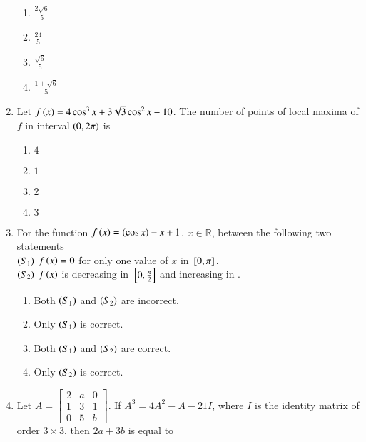 \documentclass[journal,12pt,onecolumn]{IEEEtran}
\theoremstyle{remark}
\begin{document}
\begin{enumerate}[start=1]
\begin{enumerate}
			\item $\frac{2\sqrt{6}}{5}$\\
			\item $\frac{24}{5}$\\
			\item $\frac{\sqrt{6}}{5}$\\
			\item $\frac{1+\sqrt{6}}{5}$\\
		\end{enumerate}
	\item Let $f\left(x\right)=4\cos^3{x}+3\sqrt{3}\cos^2{x}-10$. The number of points of local maxima of $f$ in interval $\left(0,2\pi\right)$ is
		\begin{enumerate}
			\item $4$\\
			\item $1$\\
			\item $2$\\
			\item $3$\\
		\end{enumerate}
	\item For the function $f\left(x\right)=\left(\cos{x}\right)-x+1$, $x\in\mathbb{R}$, between the following two statements\\
		$\left(S_1\right)$ $f\left(x\right)=0$ for only one value of $x$ in ${}\left[0,\pi\right].$\\
		$\left(S_2\right)$ $f\left(x\right)$ is decreasing in ${}\left[0,\frac{\pi}{2}\right]$ and increasing in .\\
		\begin{enumerate}
			\item Both $\left(S_1\right)$ and $\left(S_2\right)$ are incorrect.\\
			\item Only $\left(S_1\right)$ is correct.\\
			\item Both $\left(S_1\right)$ and $\left(S_2\right)$ are correct.\\
			\item Only $\left(S_2\right)$ is correct.\\
		\end{enumerate}
	\item Let $A=\begin{bmatrix}
			2 & a & 0 \\
			1 & 3 & 1 \\
			0 & 5 & b 
			\end{bmatrix}$. If $A^3=4A^2-A-21I$, where $I$ is the identity matrix of order $3\times3$, then $2a+3b$ is equal to

\end{enumerate}
\end{document}

